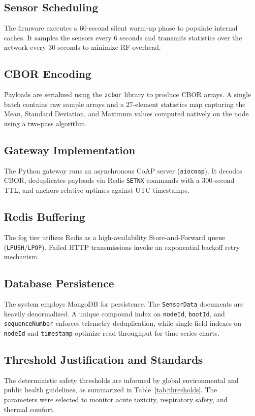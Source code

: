 \documentclass[conference]{IEEEtran}
\begin{document}
\subsection{Sensor Scheduling}
The firmware executes a 60-second silent warm-up phase to populate internal caches. It samples the sensors every 6 seconds and transmits statistics over the network every 30 seconds to minimize RF overhead.

\subsection{CBOR Encoding}
Payloads are serialized using the \texttt{zcbor} library to produce CBOR \cite{b9} arrays. A single batch contains raw sample arrays and a 27-element statistics map capturing the Mean, Standard Deviation, and Maximum values computed natively on the node using a two-pass algorithm.

\subsection{Gateway Implementation}
The Python gateway runs an asynchronous CoAP server (\texttt{aiocoap}). It decodes CBOR, deduplicates payloads via Redis \texttt{SETNX} commands with a 300-second TTL, and anchors relative uptimes against UTC timestamps.

\subsection{Redis Buffering}
The fog tier utilizes Redis as a high-availability Store-and-Forward queue (\texttt{LPUSH}/\texttt{LPOP}). Failed HTTP transmissions invoke an exponential backoff retry mechanism.

\subsection{Database Persistence}
The system employs MongoDB for persistence. The \texttt{SensorData} documents are heavily denormalized. A unique compound index on \texttt{nodeId}, \texttt{bootId}, and \texttt{sequenceNumber} enforces telemetry deduplication, while single-field indexes on \texttt{nodeId} and \texttt{timestamp} optimize read throughput for time-series charts.

\subsection{Threshold Justification and Standards}
The deterministic safety thresholds are informed by global environmental and public health guidelines, as summarized in Table~\ref{tab:thresholds}. The parameters were selected to monitor acute toxicity, respiratory safety, and thermal comfort.
\end{document}
